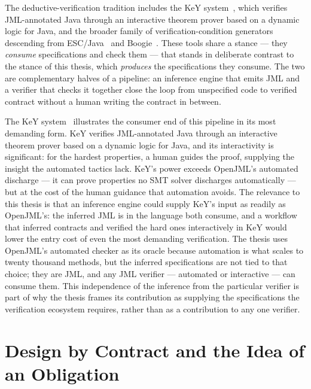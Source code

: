 The deductive-verification tradition includes the KeY system~\cite{key2016book},
which verifies JML-annotated Java through an interactive theorem prover based
on a dynamic logic for Java, and the broader family of verification-condition
generators descending from ESC/Java~\cite{flanagan2002extended} and
Boogie~\cite{barnett2005weakest}. These tools share a stance --- they
\emph{consume} specifications and check them --- that stands in deliberate
contrast to the stance of this thesis, which \emph{produces} the
specifications they consume. The two are complementary halves of a pipeline:
an inference engine that emits JML and a verifier that checks it together
close the loop from unspecified code to verified contract without a human
writing the contract in between.

The KeY system~\cite{key2016book} illustrates the consumer end of this pipeline in
its most demanding form. KeY verifies JML-annotated Java through an interactive
theorem prover based on a dynamic logic for Java, and its interactivity is
significant: for the hardest properties, a human guides the proof, supplying the
insight the automated tactics lack. KeY's power exceeds OpenJML's automated
discharge --- it can prove properties no SMT solver discharges automatically ---
but at the cost of the human guidance that automation avoids. The relevance to this
thesis is that an inference engine could supply KeY's input as readily as OpenJML's:
the inferred JML is in the language both consume, and a workflow that inferred
contracts and verified the hard ones interactively in KeY would lower the entry
cost of even the most demanding verification. The thesis uses OpenJML's automated
checker as its oracle because automation is what scales to twenty thousand methods,
but the inferred specifications are not tied to that choice; they are JML, and any
JML verifier --- automated or interactive --- can consume them. This independence
of the inference from the particular verifier is part of why the thesis frames its
contribution as supplying the specifications the verification ecosystem requires,
rather than as a contribution to any one verifier.

\section{Design by Contract and the Idea of an Obligation}
\label{sec:bg-dbc}


